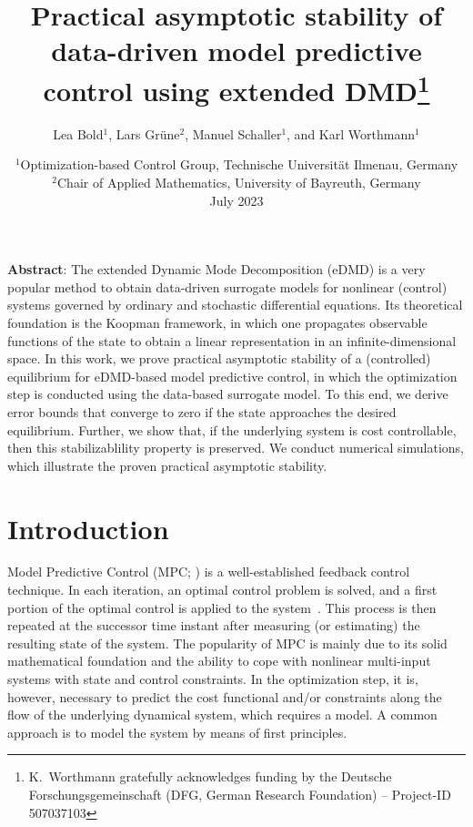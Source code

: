 \documentclass{article}
\title{Practical asymptotic stability of data-driven model
	predictive control using extended DMD\thanks{K.~Worthmann gratefully acknowledges funding by the Deutsche Forschungsgemeinschaft (DFG, German Research Foundation) -- {Project-ID 507037103}}}
\author{Lea Bold$^1$, Lars Grüne$^2$, Manuel Schaller$^1$, and Karl Worthmann$^1$}
\date{%
	\normalsize
	$^1$Optimization-based Control Group, Technische Universit\"at Ilmenau, Germany\\%
	$^2$Chair of Applied Mathematics, University of Bayreuth, Germany\\[2ex]%
	July 2023
}
\numberwithin{equation}{section}
\begin{document}
	
	\maketitle
	
	\noindent \textbf{Abstract}: The 
	extended Dynamic Mode Decomposition (eDMD) is a very popular method to obtain data-driven surrogate models for nonlinear (control) systems governed by ordinary and stochastic differential equations.
	Its theoretical foundation is the Koopman framework, in which one propagates observable functions of the state to obtain a linear representation in an infinite-dimensional space. In this work, we prove practical asymptotic stability of a (controlled) equilibrium %
	for eDMD-based model predictive control, in which the optimization step is conducted using the data-based surrogate model. To this end, we derive error bounds that converge to zero if the state approaches the desired equilibrium.
	Further, we show that, if the underlying system is cost controllable, 
	then this stabilizablility property is preserved. 
	We conduct numerical simulations, which illustrate the proven practical asymptotic stability.
	
	
	\section{Introduction}
	Model Predictive Control (MPC; \cite{GrunPann17,RawlMayn17}) is a well-established feedback control technique. 
	In each iteration, an optimal control problem is solved, and a first portion of the optimal control is applied to the system~\cite{CoroGrun20}. This process is then repeated at the successor time instant after measuring (or estimating) the resulting state of the system. The popularity of MPC is mainly due to its solid mathematical foundation and the ability to cope with nonlinear multi-input systems with state and control constraints. In the optimization step, it is, however, necessary to predict the cost functional and/or constraints along the flow of the underlying dynamical system, which requires a model. A common approach is to model the system by means of first principles. 
	
\end{document}

